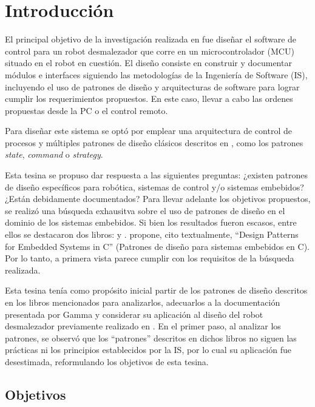 \chapter{Introducción}

El principal objetivo de la investigación realizada en \cite{paperPomponio} fue diseñar el software de control para un robot desmalezador que corre en un microcontrolador (MCU) situado en el robot en cuestión. El diseño consiste en construir y documentar módulos e interfaces siguiendo las metodologías de la Ingeniería de Software (IS), incluyendo el uso de patrones de diseño y arquitecturas de software para lograr cumplir los requerimientos propuestos. En este caso, llevar a cabo las ordenes propuestas desde la PC o el control remoto.

Para diseñar este sistema se optó por emplear una arquitectura de control de procesos \cite[pág. 27]{ShawGarlan1996} y múltiples patrones de diseño clásicos descritos en \cite{Gamma:1995:DPE:186897}, como los patrones \textit{state}, \textit{command} o \textit{strategy}.

Esta tesina se propuso dar respuesta a las siguientes preguntas: ¿existen patrones de diseño específicos para robótica, sistemas de control y/o sistemas embebidos? ¿Están debidamente documentados? Para llevar adelante los objetivos propuestos, se realizó una búsqueda exhausitva sobre el uso de patrones de diseño en el dominio de los sistemas embebidos. Si bien los resultados fueron escasos,  entre ellos se destacaron dos libros: \cite{douglass} y \cite{elecia-embedded}. \cite{douglass} propone, cito textualmente, ``Design Patterns for Embedded Systems in C'' (Patrones de diseño para sistemas embebidos en C). Por lo tanto, a primera vista parece cumplir con los requisitos de la búsqueda realizada.

Esta tesina tenía como propósito inicial partir de los patrones de diseño descritos en los libros mencionados para analizarlos, adecuarlos a la documentación presentada por Gamma \cite{Gamma:1995:DPE:186897} y considerar su aplicación al diseño del robot desmalezador previamente realizado en \cite{paperPomponio}. En el primer paso, al analizar los patrones, se observó que los ``patrones'' descritos en dichos libros no siguen las prácticas ni los principios establecidos por la IS, por lo cual su aplicación fue desestimada, reformulando los objetivos de esta tesina.

\section*{Objetivos}


